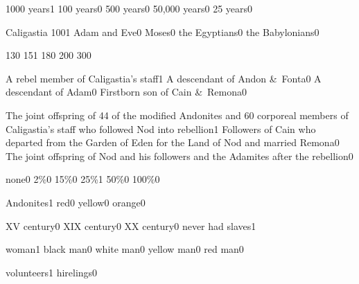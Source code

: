{1000 years}{1}
{100 years}{0}
{500 years}{0}
{50,000 years}{0}
{25 years}{0}
\qstop

{Caligastia 100}{1}
{Adam and Eve}{0}
{Moses}{0}
{the Egyptians}{0}
{the Babylonians}{0}
\qstop

{13}{0}
{15}{1}
{18}{0}
{20}{0}
{30}{0}
\qstop


{A rebel member of Caligastia's staff}{1}
{A descendant of Andon \&\ Fonta}{0}
{A descendant of Adam}{0}
{Firstborn son of Cain \&\ Remona}{0}
\qstop

{The joint offspring of 44 of the modified Andonites and 60 corporeal members of Caligastia's staff who followed Nod into rebellion}{1}
{Followers of Cain who departed from the Garden of Eden for the Land of Nod and married Remona}{0}
{The joint offspring of Nod and his followers and the Adamites after the rebellion}{0}
\qstop


{none}{0}
{2\%}{0}
{15\%}{0}
{25\%}{1}
{50\%}{0}
{100\%}{0}
\qstop

{Andonites}{1}
{red}{0}
{yellow}{0}
{orange}{0}
\qstop


{XV century}{0}
{XIX century}{0}
{XX century}{0}
{never had slaves}{1}
\qstop

{woman}{1}
{black man}{0}
{white man}{0}
{yellow man}{0}
{red man}{0}
\qstop





{volunteers}{1}
{hirelings}{0}
\qstop

